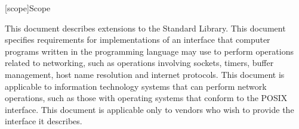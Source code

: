 
[scope]{Scope}

\pnum
 This document describes extensions to the \Cpp Standard Library. This document specifies requirements for implementations of an interface that computer programs written in the \Cpp programming language may use to perform operations related to networking, such as operations involving sockets, timers, buffer management, host name resolution and internet protocols. This document is applicable to information technology systems that can perform network operations, such as those with operating systems that conform to the POSIX interface. This document is applicable only to vendors who wish to provide the interface it describes.

